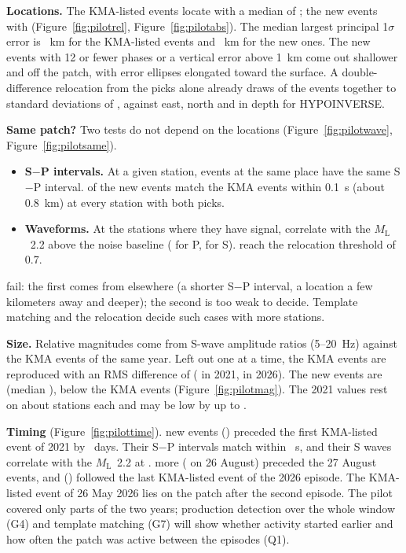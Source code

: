 \documentclass[11pt,a4paper]{article}
\newcommand{\ML}{\ensuremath{M_\mathrm{L}}}
\newcommand{\figref}[1]{Figure~\ref{#1}}
\begin{document}
\textbf{Locations.} The KMA-listed events locate with a median of ; the new events with  (\figref{fig:pilotrel}, \figref{fig:pilotabs}). The median largest principal 1$\sigma$ error is ~km for the KMA-listed events and ~km for the new ones. The  new events with 12 or fewer phases or a vertical error above 1~km come out shallower and off the patch, with error ellipses elongated toward the surface. A double-difference relocation from the picks alone already draws  of the events together to standard deviations of , against  east, north and in depth for HYPOINVERSE.

\textbf{Same patch?} Two tests do not depend on the locations (\figref{fig:pilotwave}, \figref{fig:pilotsame}).
\begin{itemize}
\item \textbf{S$-$P intervals.} At a given station, events at the same place have the same S$-$P interval.  of the  new events match the KMA events within 0.1~s (about 0.8~km) at every station with both picks.
\item \textbf{Waveforms.} At the stations where they have signal,  correlate with the \ML\ 2.2 above the noise baseline ( for P,  for S).  reach the relocation threshold of 0.7.
\end{itemize}
 fail: the first comes from elsewhere (a shorter S$-$P interval, a location a few kilometers away and deeper); the second is too weak to decide. Template matching and the relocation decide such cases with more stations.

\textbf{Size.} Relative magnitudes come from S-wave amplitude ratios (5--20~Hz) against the KMA events of the same year. Left out one at a time, the KMA events are reproduced with an RMS difference of  ( in 2021,  in 2026). The new events are  (median ), below the KMA events (\figref{fig:pilotmag}). The 2021 values rest on about  stations each and may be low by up to .

\textbf{Timing} (\figref{fig:pilottime}).  new events () preceded the first KMA-listed event of 2021 by ~days. Their S$-$P intervals match within ~s, and their S waves correlate with the \ML\ 2.2 at .  more ( on 26 August) preceded the 27 August events, and  () followed the last KMA-listed event of the 2026 episode. The KMA-listed event of 26 May 2026 lies on the patch after the second episode. The pilot covered only parts of the two years; production detection over the whole window (G4) and template matching (G7) will show whether activity started earlier and how often the patch was active between the episodes (Q1).
\end{document}
